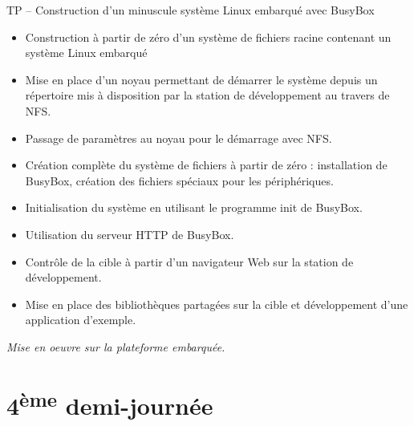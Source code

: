 \documentclass[a4paper,12pt,obeyspaces,spaces,hyphens]{article}
\begin{document}
\feagendaonecolumn
{TP – Construction d'un minuscule système Linux embarqué avec BusyBox}
{
  \begin{itemize}
  \item Construction à partir de zéro d'un système de fichiers racine
    contenant un système Linux embarqué
  \item Mise en place d'un noyau permettant de démarrer le système
    depuis un répertoire mis à disposition par la station de
    développement au travers de NFS.
  \item Passage de paramètres au noyau pour le démarrage avec NFS.
  \item Création complète du système de fichiers à partir de zéro :
    installation de BusyBox, création des fichiers spéciaux pour les
    périphériques.
  \item Initialisation du système en utilisant le programme init de BusyBox.
  \item Utilisation du serveur HTTP de BusyBox.
  \item Contrôle de la cible à partir d'un navigateur Web sur la
    station de développement.
  \item Mise en place des bibliothèques partagées sur la cible et
    développement d'une application d'exemple.
  \end{itemize}

  \vspace{0.5cm}
  {\em Mise en oeuvre sur la plateforme embarquée.}
}

\section{4\textsuperscript{ème} demi-journée}
\end{document}
